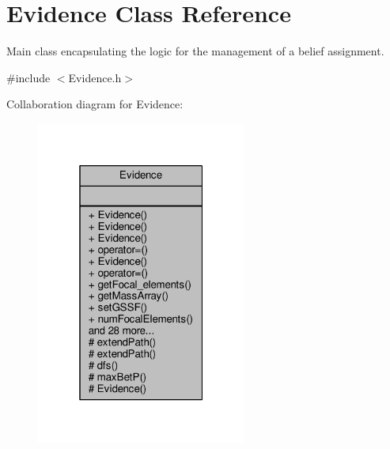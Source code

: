 \hypertarget{classEvidence}{}\section{Evidence Class Reference}
\label{classEvidence}


Main class encapsulating the logic for the management of a belief assignment.  




{\ttfamily \#include $<$Evidence.\+h$>$}



Collaboration diagram for Evidence\+:\nopagebreak
\begin{figure}[H]
\begin{center}
\leavevmode
\includegraphics[width=196pt]{classEvidence__coll__graph}
\end{center}
\end{figure}
